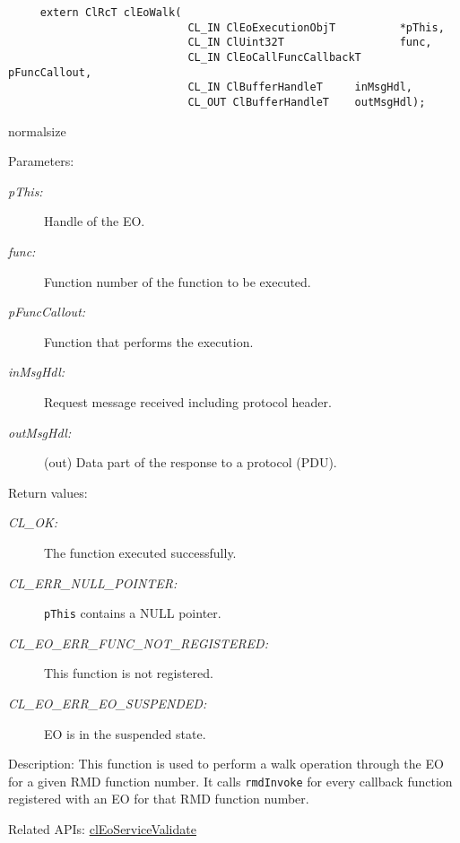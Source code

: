 \begin{flushleft}
\begin{Desc}
\footnotesize\begin{verbatim}     extern ClRcT clEoWalk(
                 			CL_IN ClEoExecutionObjT          *pThis,
                 			CL_IN ClUint32T                  func,
                 			CL_IN ClEoCallFuncCallbackT      pFuncCallout,
                 			CL_IN ClBufferHandleT     inMsgHdl,
                 			CL_OUT ClBufferHandleT    outMsgHdl);
\end{verbatim}
  normalsize
\end{Desc}
\begin{Desc}
\item[Parameters:]
\begin{description}
\item[{\em p\-This:}]Handle of the EO. 
\item[{\em func:}]Function number of the function to be executed. 
\item[{\em p\-Func\-Callout:}]Function that performs the execution. 
\item[{\em in\-Msg\-Hdl:}]Request message received including protocol header. 
\item[{\em out\-Msg\-Hdl:}](out) Data part of the response to a protocol (PDU).\end{description}
\end{Desc}
\begin{Desc}
\item[Return values:]
\begin{description}
\item[{\em CL\_\-OK:}]The function executed successfully. 
\item[{\em CL\_\-ERR\_\-NULL\_\-POINTER:}]{\tt{pThis}} contains a NULL pointer. 
\item[{\em CL\_\-EO\_\-ERR\_\-FUNC\_\-NOT\_\-REGISTERED:}]This function is not registered. 
\item[{\em CL\_\-EO\_\-ERR\_\-EO\_\-SUSPENDED:}]EO is in the suspended state.\end{description}
\end{Desc}
\begin{Desc}
\item[Description:]This function is used to perform a walk operation through the EO for a given RMD function number. It calls {\tt{rmdInvoke}} for every 
callback function registered with an EO for that RMD function number.\end{Desc}
\begin{Desc}
\item[Related APIs:]\hyperlink{pageeo104}{cl\-Eo\-Service\-Validate} \end{Desc}



\end{flushleft}

